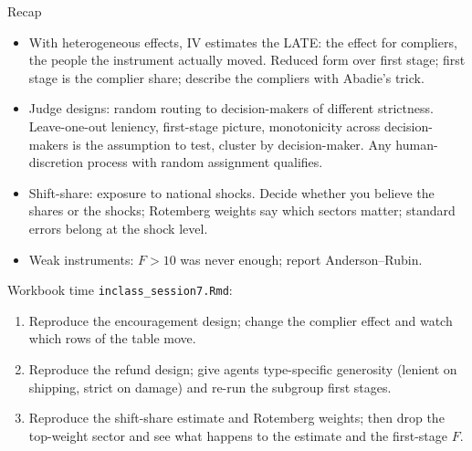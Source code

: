 \documentclass[aspectratio=169,11pt]{beamer}
\begin{document}
\begin{frame}{Recap}
\begin{itemize}
	\item With heterogeneous effects, IV estimates the \alert{LATE}: the effect for compliers, the people the
	instrument actually moved. Reduced form over first stage; first stage is the complier share; describe the
	compliers with Abadie's trick.
	\medskip
	\item \alert{Judge designs}: random routing to decision-makers of different strictness. Leave-one-out
	leniency, first-stage picture, monotonicity across decision-makers is the assumption to test, cluster by
	decision-maker. Any human-discretion process with random assignment qualifies.
	\medskip
	\item \alert{Shift-share}: exposure to national shocks. Decide whether you believe the shares or the shocks;
	Rotemberg weights say which sectors matter; standard errors belong at the shock level.
	\medskip
	\item \alert{Weak instruments}: $F > 10$ was never enough; report Anderson--Rubin.
\end{itemize}
\end{frame}


\begin{frame}{Workbook time}
\texttt{inclass\_session7.Rmd}:
\begin{enumerate}
	\item Reproduce the encouragement design; change the complier effect and watch which rows of the table move.
	\item Reproduce the refund design; give agents type-specific generosity (lenient on shipping, strict on
	damage) and re-run the subgroup first stages.
	\item Reproduce the shift-share estimate and Rotemberg weights; then drop the top-weight sector and see
	what happens to the estimate and the first-stage $F$.
\end{enumerate}
\end{frame}
\end{document}
